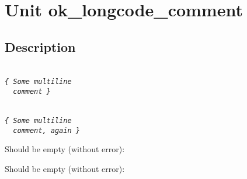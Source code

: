 \documentclass{report}
\begin{document}
\newlength{\tmplength}
\chapter{Unit ok{\_}longcode{\_}comment}
\section{Description}
\texttt{\\\nopagebreak[3]
\textit{{\{}~Some~multiline\\\nopagebreak[3]
~~comment~{\}}}\\
}

\texttt{\\\nopagebreak[3]
\textit{{\{}~Some~multiline\\\nopagebreak[3]
~~comment,~again~{\}}}\\
}

Should be empty (without error):

\texttt{}

Should be empty (without error):

\texttt{}
\end{document}
